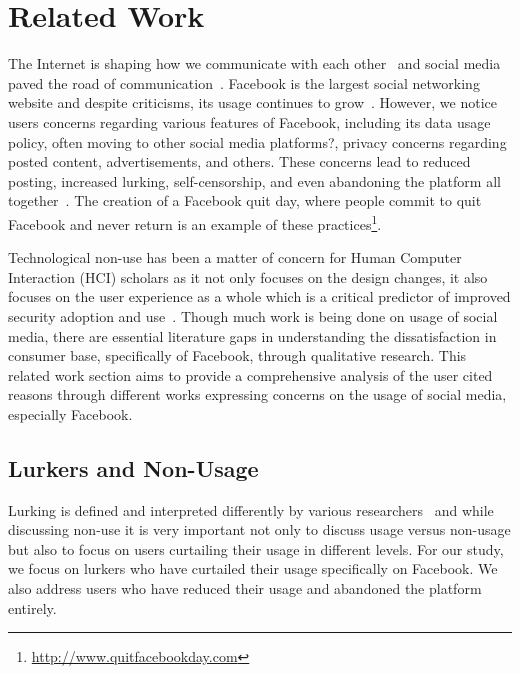 \section{Related Work}
\label{sec:relatedwork}
The Internet is shaping how we communicate with each other~\cite{wellman2003social} and social media paved the road of communication~\cite{bijker2012social}. Facebook is the largest social networking website and despite criticisms, its usage continues to grow~\cite{joinson2008looking}. However, we notice users concerns regarding various features of Facebook, including its data usage policy, often moving to other social media platforms?, privacy concerns regarding posted content, advertisements, and others. These concerns lead to reduced posting, increased lurking, self-censorship, and even abandoning the platform all together~\cite{wyatt2003non,karppi2011digital,gillette2015facebook}. The creation of a Facebook quit day, where people commit to quit Facebook and never return is an example of these practices\footnote{\url{http://www.quitfacebookday.com}}. 

Technological non-use has been a matter of concern for Human Computer Interaction (HCI) scholars as it not only focuses on the design changes, it also focuses on the user experience as a whole which is a critical predictor of improved security adoption and use~\cite{baumer2015importance}. Though much work is being done on usage of social media, there are essential literature gaps in understanding the dissatisfaction in consumer base, specifically of Facebook, through qualitative research. This related work section aims to provide a comprehensive analysis of the user cited reasons through different works expressing concerns on the usage of social media, especially Facebook.

\subsection{Lurkers and Non-Usage}
Lurking is defined and interpreted differently by various researchers~\cite{crawford2009following,schultz2004lurkers} and while discussing non-use it is very important not only to discuss usage versus non-usage but also to focus on users curtailing their usage in different levels. For our study, we focus on lurkers who have curtailed their usage specifically on Facebook. We also address users who have reduced their usage and abandoned the platform entirely.

